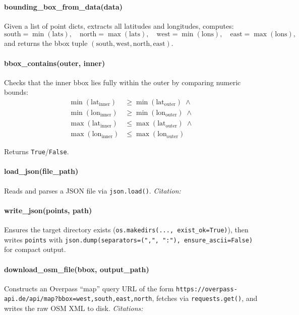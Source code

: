 \documentclass[11pt,a4paper]{article}
\begin{document}
\paragraph{bounding\_box\_from\_data(data)}
Given a list of point dicts, extracts all latitudes and longitudes, computes:
\[
	\text{south} = \min(\mathrm{lats}), \quad
	\text{north} = \max(\mathrm{lats}),\quad
	\text{west}  = \min(\mathrm{lons}),\quad
	\text{east}  = \max(\mathrm{lons}),
\]
and returns the bbox tuple \((\text{south},\text{west},\text{north},\text{east})\).

\paragraph{bbox\_contains(outer, inner)}
Checks that the inner bbox lies fully within the outer by comparing numeric bounds:
\begin{align*}
	\min(\mathrm{lat}_{\mathrm{inner}}) & \ge \min(\mathrm{lat}_{\mathrm{outer}})\;\wedge{} \\
	\min(\mathrm{lon}_{\mathrm{inner}}) & \ge \min(\mathrm{lon}_{\mathrm{outer}})\;\wedge{} \\
	\max(\mathrm{lat}_{\mathrm{inner}}) & \le \max(\mathrm{lat}_{\mathrm{outer}})\;\wedge{} \\
	\max(\mathrm{lon}_{\mathrm{inner}}) & \le \max(\mathrm{lon}_{\mathrm{outer}})
\end{align*}

Returns \texttt{True}/\texttt{False}.


\paragraph{load\_json(file\_path)}
Reads and parses a JSON file via \texttt{json.load()}.
\emph{Citation:} \citep{python-json-doc}

\paragraph{write\_json(points, path)}
Ensures the target directory exists (\texttt{os.makedirs(..., exist\_ok=True)}), then writes \texttt{points} with \texttt{json.dump(separators=(",", ":"), ensure\_ascii=False)} for compact output.

\paragraph{download\_osm\_file(bbox, output\_path)}
Constructs an Overpass “map” query URL of the form
\texttt{https://overpass-api.de/api/map?bbox=west,south,east,north},
fetches via \texttt{requests.get()}, and writes the raw OSM XML to disk.
\emph{Citations:} \citep{overpass-api-doc,python-requests-doc}
\end{document}
